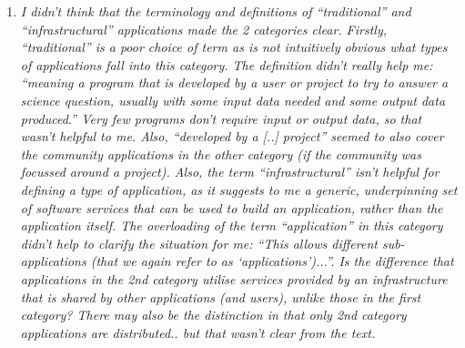 \documentclass{article}
\newcommand{\katznote}[1]{{\textcolor{magenta} { ***Dan: #1 }}}
\newcommand{\nchnote}[1]{ {\textcolor{orange} { ***Neil: #1 }}}
\newcommand{\katznote}[1]{}
\newcommand{\nchnote}[1]{}
\begin{document}
\begin{enumerate}
\textbf{Response:}

\katznote{attention needed here re distributed and dynamic part of comment}

\nchnote{Partial response:} We have added a summary description of what we mean by distributed and dynamic at the start of Section 2 to reflect the fact that definition of the terminology arose and was refined by the discussions at the workshops, and the analysis of the application scenarios presented.

\katznote{partial response:} In addition, recognizing that the two reviewers have different styles of reading
and different areas of expertise (as do we as authors), we have added a paragraph at the end
of Section 1 to explain how different types of readers might want to approach this paper.  We do
not believe that there is one single way of organizing it that would satisfy all readers.  We have also
added a longer description of each section at this same place.  Also, see our response to point 10 below.

\hspace{-0.7cm}Section 2.

\item \emph{I didn't think that the terminology and definitions of ``traditional'' and ``infrastructural'' applications made the 2 categories clear. Firstly, ``traditional'' is a poor choice of term as is not intuitively obvious what types of applications fall into this category. The definition didn't really help me: ``meaning a program that is developed by a user or project to try to answer a science question, usually with some input data needed and some output data produced.'' Very few programs don't require input or output data, so that wasn't helpful to me. Also, ``developed by a [..] project'' seemed to also cover the community applications in the other category (if the community was focussed around a project). Also, the term ``infrastructural'' isn't helpful for defining a type of application, as it suggests to me a generic, underpinning set of software services that can be used to build an application, rather than the application itself. The overloading of the term ``application'' in this category didn't help to clarify the situation for me: ``This allows different sub-applications (that we again refer to as `applications')...''. Is the difference that applications in the 2nd category utilise services provided by an infrastructure that is shared by other applications (and users), unlike those in the first category? There may also be the distinction in that only 2nd category applications are distributed.. but that wasn't clear from the text.}



\end{enumerate}
\end{document}

